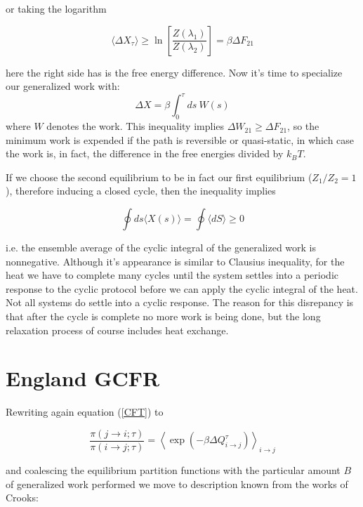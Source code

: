 \documentclass[a4paper,12pt,nofootinbib]{article}
\begin{document}
or taking the logarithm

\begin{equation}
  \langle \Delta X_\tau \rangle \geq \ln\left[\frac{Z(\lambda_1)}{Z(\lambda_2)}\right]=\beta \Delta F_{21}
\end{equation}

here the right side has is the free energy difference. Now it's time to specialize our generalized work with:
\begin{equation}
  \Delta X = \beta \int_0^\tau ds\ W(s)
\end{equation}
where $W$ denotes the work. This inequality implies $\Delta W_{21} \geq \Delta F_{21} $, so the minimum work is expended if the path is reversible or quasi-static, in which case the work is, in fact, the difference in the free energies divided by $k_B T$.

If we choose the second equilibrium to be in fact our first equilibrium ($Z_1/Z_2=1$), therefore inducing a closed cycle, then the inequality implies

\begin{equation}
\label{CyclicInequalityForGeneralizedWork}
  \oint ds \langle X(s) \rangle = \oint \langle dS \rangle \geq 0
\end{equation}

i.e. the ensemble average of the cyclic integral of the generalized work is nonnegative.
Although it's appearance is similar to Clausius inequality, for the heat we have to complete many cycles until the system settles into a periodic response to the cyclic protocol before we can apply the cyclic integral of the heat. Not all systems do settle into a cyclic response. The reason for this disrepancy is that after the cycle is complete no more work is being done, but the long relaxation process of course includes heat exchange. 

\section{England GCFR}

Rewriting again equation (\ref{CFT}) to 

\begin{equation}
\frac{\pi (j\to i;\tau )}{\pi (i\to j;\tau )}=\left\langle \exp \left(-\beta  \Delta Q_{i\to j}^{\tau }\right)\right\rangle_{i\to j}
\end{equation}

and coalescing the equilibrium partition functions with the particular amount $B$ of generalized work performed we move to description known from the works of Crooks:
\end{document}
